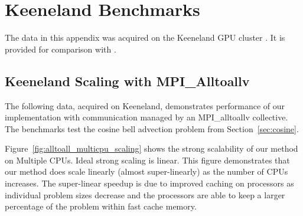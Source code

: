 
\chapter{Keeneland Benchmarks}
\label{app:keeneland_alltoallv_benchmarks}
The data in this appendix was acquired on the Keeneland GPU cluster \cite{Vetter2011}. It is provided for comparison with \cite{BolligFlyerErlebacher2012}.

\section{Keeneland Scaling with MPI\_Alltoallv}

The following data, acquired on Keeneland, demonstrates performance of our implementation with communication managed by an MPI\_alltoallv collective. The benchmarks test the cosine bell advection problem from Section~\ref{sec:cosine}. 

Figure~\ref{fig:alltoall_multicpu_scaling} shows the strong scalability of our method on Multiple CPUs. Ideal strong scaling is linear. This figure demonstrates that our method does scale linearly (almost super-linearly) as the number of CPUs increases. 
The super-linear speedup is due to improved caching on processors as individual problem sizes decrease and the processors are able to keep a larger percentage of the problem within fast cache memory.

